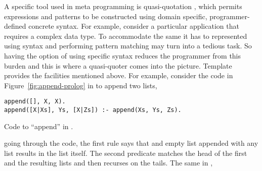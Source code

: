 \documentclass[thesis-solanki.tex]{subfiles}
\begin{document}
A specific tool used in meta programming is quasi-quotation
\cite{mainland2007s,haskellquasi,wikiquasi},
which permits
 expressions and patterns to be constructed using domain specific, pro\-gram\-mer-de\-fined concrete
syntax.
For example, consider a particular application that requires a complex data type.
To accommodate the same it has to represented
using  syntax and performing
pattern matching may
turn into a tedious task.
So having the option of using specific syntax reduces the programmer from this burden and this is where a
quasi-quoter comes into the picture.
Template  provides the facilities mentioned above.
For example, consider the code in Figure~\ref{fig:append-prolog}
in  to append two lists,
\begin{code-list}[h]
\begin{verbatim}
append([], X, X).
append([X|Xs], Ys, [X|Zs]) :- append(Xs, Ys, Zs).
\end{verbatim}    
\vspace*{-0.8\baselineskip}
\caption{Code to ``append'' in \protect{}.}
\label{fig:append-prolog}
\end{code-list}
going through the code, the first rule says that and empty list appended with any list results in the list itself.
The second predicate matches the head of the first and the resulting
lists and then recurses on the tails. 
The same in ,
\inputminted[linenos]{haskell}{append.pl}
\end{document}
